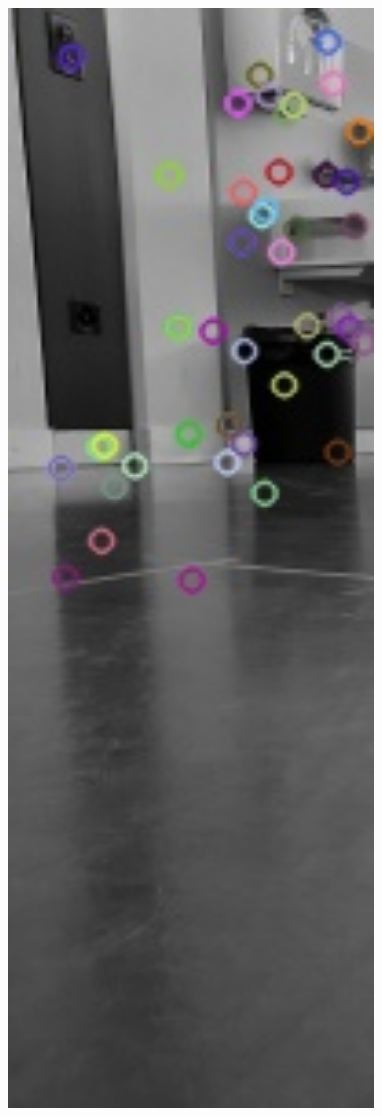 \begin{figure}[H]
  \centering
  \begin{minipage}[t]{0.22\linewidth}
  \includegraphics[width=1.0\textwidth]{img/piktogrammerkennung/slice0_kp2.jpg}

\end{minipage}
\end{figure}
